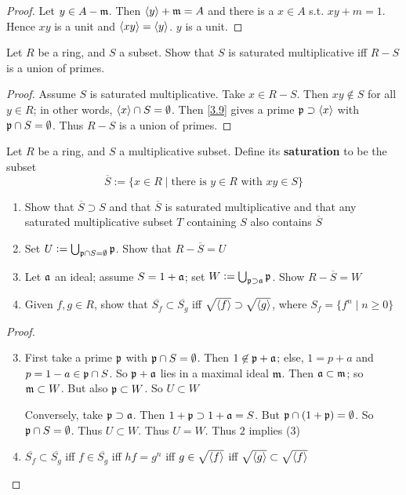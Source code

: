 \documentclass[11pt]{article}
\begin{document}
\begin{proof}
Let \(y\in A-\mathfrak{m}\). Then \(\langle y\rangle+\mathfrak{m}=A\) and there is a \(x\in A\) s.t.
\(xy+m=1\). Hence \(xy\) is a unit and \(\langle xy\rangle=\langle y\rangle\). \(y\) is a unit.
\end{proof}

\begin{exercise}
\label{3.24}
Let \(R\) be a ring, and \(S\) a subset. Show that \(S\) is saturated
multiplicative iff \(R-S\) is a union of primes.
\end{exercise}

\begin{proof}
Assume \(S\) is saturated multiplicative. Take \(x\in R-S\). Then \(xy\not\in
   S\) for all \(y\in R\); in other words, \(\langle x\rangle\cap S=\emptyset\). Then
\ref{3.9} gives a prime \(\mathfrak{p}\supset\langle x\rangle\) with \(\mathfrak{p}\cap S=\emptyset\).
Thus \(R-S\) is a union of primes.
\end{proof}

\begin{exercise}
\label{3.25}
Let \(R\) be a ring, and \(S\) a multiplicative subset. Define its \textbf{saturation}
to be the subset
\begin{equation*}
\overbar{S}:=\{x\in R\mid\text{there is }y\in R\text{ with }xy\in S\}
\end{equation*}
\begin{enumerate}
\item Show that \(\overbar{S}\supset S\) and that \(\overbar{S}\) is saturated
multiplicative and that any saturated multiplicative subset \(T\)
containing \(S\) also contains \(\overbar{S}\)
\item Set \(U:=\bigcup_{\mathfrak{p}\cap S=\emptyset}\mathfrak{p}\). Show that \(R-\overbar{S}=U\)
\item Let \(\mathfrak{a}\) an ideal; assume \(S=1+\mathfrak{a}\); set
\(W:=\bigcup_{\mathfrak{p}\supset\mathfrak{a}}\mathfrak{p}\). Show \(R-\overbar{S}=W\)
\item Given \(f,g\in R\), show that \(\overbar{S_f}\subset\overbar{S_g}\) iff
\(\sqrt{\langle f\rangle}\supset\sqrt{\langle g\rangle}\), where \(S_f=\{f^n\mid n\ge0\}\)
\end{enumerate}
\end{exercise}

\begin{proof}
\begin{enumerate}
\setcounter{enumi}{2}
\item First take a prime \(\mathfrak{p}\) with \(\mathfrak{p}\cap S=\emptyset\). Then
\(1\not\in\mathfrak{p}+\mathfrak{a}\); else, \(1=p+a\) and \(p=1-a\in\mathfrak{p}\cap S\). So
\(\mathfrak{p}+\mathfrak{a}\) lies in a maximal ideal \(\mathfrak{m}\). Then \(\mathfrak{a}\subset\mathfrak{m}\); so
\(\mathfrak{m}\subset W\). But also \(\mathfrak{p}\subset W\). So \(U\subset W\)

Conversely, take \(\mathfrak{p}\supset\mathfrak{a}\). Then \(1+\mathfrak{p}\supset 1+\mathfrak{a}=S\). But
\(\mathfrak{p}\cap(1+\mathfrak{p})=\emptyset\). So \(\mathfrak{p}\cap S=\emptyset\). Thus \(U\subset
      W\). Thus \(U=W\). Thus \(2\) implies (3)

\item \(\overbar{S_f}\subset\overbar{S_g}\) iff \(f\in\overbar{S_g}\) iff
\(hf=g^n\) iff \(g\in\sqrt{\langle f\rangle}\) iff \(\sqrt{\langle
      g\rangle}\subset\sqrt{\langle f\rangle}\)
\end{enumerate}
\end{proof}
\end{document}

